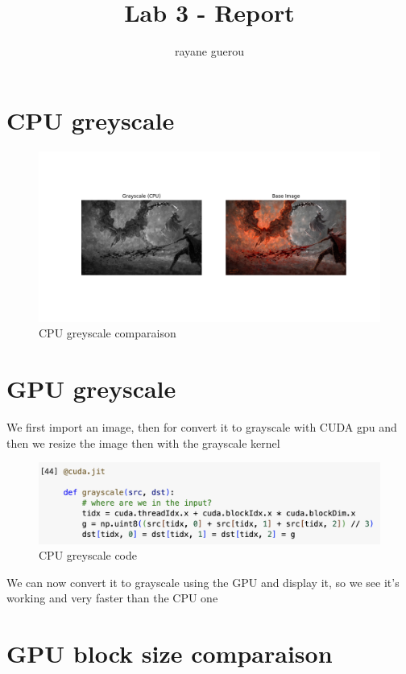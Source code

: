 \documentclass[a4paper]{article}
\title{Lab 3 - Report}
\author{rayane guerou}
\begin{document}
\maketitle

\section{CPU greyscale}

\begin{figure}[h!]
\centering
\includegraphics[scale=0.4]{../src/grayscale_cpu.png}
\caption{CPU greyscale comparaison}
\end{figure}
\vspace{1cm}

\section{GPU greyscale}
We first import an image, then for convert it to grayscale with CUDA gpu and then we resize the image then with the grayscale kernel 

\begin{figure}[h!]
\centering
\includegraphics[scale=0.5]{../src/grayscale.png}
\caption{CPU greyscale code}
\end{figure}

We can now convert it to grayscale using the GPU and display it, so we see it's working and very faster than the CPU one
\vspace{5cm}
\section{GPU block size comparaison}
\end{document}
